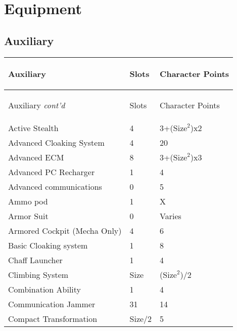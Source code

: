 \documentclass[twoside]{book}
\begin{document}
    

\section{Equipment}
    
    

\subsection{Auxiliary}
    
\begin{longtable}{p{1.25in}ll} 
  Auxiliary& \begin{turn}{70}{Slots}\end{turn}
          & \begin{turn}{70}{Character Points}\end{turn}
          \\
  \hline
  \hline
  \endfirsthead
  Auxiliary \textit{cont'd}
        & \begin{turn}{70}{Slots}\end{turn}
          & \begin{turn}{70}{Character Points}\end{turn}
           \\
  \hline
  \endhead
\raggedright Active Stealth & 4 & 3+(\begin{math}{\textrm{Size}}^{2}\end{math})x2
           \tabularnewline
      \raggedright Advanced Cloaking System
           & 4 & 20 \tabularnewline
      \raggedright Advanced ECM & 8 & 3+(\begin{math}{\textrm{Size}}^{2}\end{math})x3
           \tabularnewline
      \raggedright Advanced PC Recharger & 1 & 4 \tabularnewline
      \raggedright Advanced communications
           & 0 & 5 \tabularnewline
      \raggedright Ammo pod & 1 & X \tabularnewline
      \raggedright Armor Suit & 0 & Varies \tabularnewline
      \raggedright Armored Cockpit (Mecha Only)
           & 4 & 6 \tabularnewline
      \raggedright Basic Cloaking system & 1 & 8 \tabularnewline
      \raggedright Chaff Launcher & 1 & 4 \tabularnewline
      \raggedright Climbing System & Size & (\begin{math}{\textrm{Size}}^{2}\end{math})/2 \tabularnewline
      \raggedright Combination Ability & 1 & 4 \tabularnewline
      \raggedright Communication Jammer & 31 & 14 \tabularnewline
      \raggedright Compact Transformation & Size/2 & 5 \tabularnewline

\end{longtable}
\end{document}
